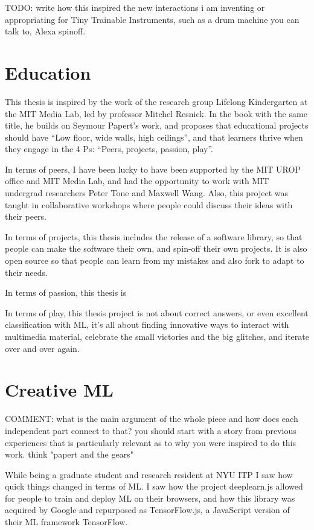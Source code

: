 TODO: write how this inspired the new interactions i am inventing or appropriating for Tiny Trainable Instruments, such as a drum machine you can talk to, Alexa spinoff.

\section{Education}

This thesis is inspired by the work of the research group Lifelong Kindergarten at the MIT Media Lab, led by professor Mitchel Resnick. In the book with the same title, he builds on Seymour Papert’s work, and proposes that educational projects should have “Low floor, wide walls, high ceilings”, and that learners thrive when they engage in the 4 Ps: “Peers, projects, passion, play”.

In terms of peers, I have been lucky to have been supported by the MIT UROP office and MIT Media Lab, and had the opportunity to work with MIT undergrad researchers Peter Tone and Maxwell Wang. Also, this project was taught in collaborative workshops where people could discuss their ideas with their peers.

In terms of projects, this thesis includes the release of a software library, so that people can make the software their own, and spin-off their own projects. It is also open source so that people can learn from my mistakes and also \gls{fork} to adapt to their needs.

In terms of passion, this thesis is 

In terms of play, this thesis project is not about correct answers, or even excellent classification with \acrshort{ML}, it's all about finding innovative ways to interact with multimedia material, celebrate the small victories and the big glitches, and iterate over and over again.

\section{Creative ML}

COMMENT: what is the main argument of the whole piece and how does each independent part connect to that? you should start with a story from previous experiences that is particularly relevant as to why you were inspired to do this work. think "papert and the gears"

While being a graduate student and research resident at \acrshort{NYU} \acrshort{ITP} I saw how quick things changed in terms of \acrshort{ML}. I saw how the project deeplearn.js allowed for people to train and deploy \acrshort{ML} on their browsers, and how this library was acquired by Google and repurposed as TensorFlow.js, a JavaScript version of their \acrshort{ML} framework TensorFlow.

